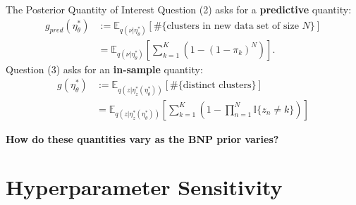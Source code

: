\documentclass[10pt]{beamer}\usepackage[]{graphicx}\usepackage[]{color}
\newcommand{\Expect}{\mathbb{E}}
\newcommand{\etazopt}{\eta_z^{*}}
\newcommand{\etathetaopt}{\eta_\theta^{*}}
\begin{document}
\begin{frame}{The Posterior Quantity of Interest}
Question (2) asks for a {\bf predictive} quantity: 
\begin{align*}
g_{pred}(\etathetaopt) &:=
\Expect_{q(\nu \vert \etathetaopt)} \left[\#\{\text{clusters in new data set of size $N$}\} \right]  \\
&=
\Expect_{q(\nu \vert \etathetaopt)} \left[\sum_{k=1}^K \left(1 - (1 - \pi_k)^{N}\right)\right].
\end{align*}
%
\pause 
%
Question (3) asks for an {\bf in-sample} quantity: 
\begin{align*}
g(\etathetaopt) &:=
\Expect_{q(z \vert \etazopt(\etathetaopt))} \left[ \#\{\text{distinct clusters}\} \right]  \\
&=
\Expect_{q(z \vert \etazopt(\etathetaopt))} \left[
    \sum_{k=1}^K \left(1 - \prod_{n=1}^N \mathbb{I}\{z_n \ne k\} \right)
    \right]
\end{align*}
%
\pause\vspace{-0.1in}
%
\begin{mdframed}[style=MyFrame]
\begin{center}
{\bf How do these quantities vary as the BNP prior varies? }
\end{center}
\end{mdframed}

\end{frame}


\section{Hyperparameter Sensitivity}
\end{document}
